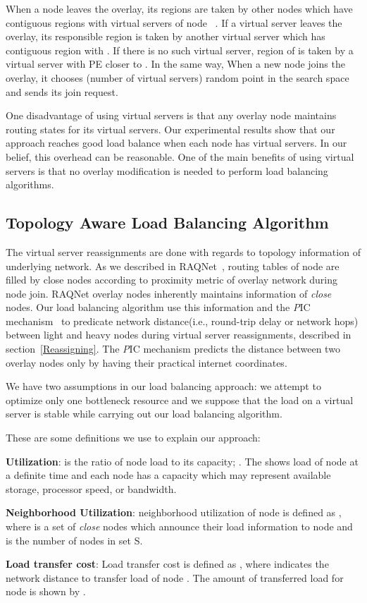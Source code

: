 \documentclass {article}
\begin{document}
When a node  leaves the overlay, its  regions  are taken by other nodes which have contiguous regions with virtual servers of node ~\cite{RAQNet}. If a virtual server  leaves the overlay, its responsible region is taken by another virtual server  which has contiguous region with . If there is no such virtual server, region of  is taken by a virtual server with  PE closer to .
 In the same way, When a new node   joins the overlay, it chooses  (number of virtual servers) random point  in the search space and sends
its join request.


One disadvantage of using virtual servers is that
any overlay node maintains  routing states for its virtual servers.
Our experimental results show that our approach reaches good load  balance when each node has  virtual servers.
In our belief, this overhead can be reasonable. One of the main benefits of using virtual servers is that no overlay modification is needed to perform load balancing algorithms.
\subsection { Topology Aware Load Balancing Algorithm}
The virtual server reassignments are done with regards to topology information of underlying network.
As we described in RAQNet~\cite{RAQNet},
routing tables of  node are filled by close nodes according to proximity metric of overlay network during node join.
 RAQNet overlay nodes inherently maintains information of \emph{close} nodes. Our load balancing algorithm use this information and the {\emph PIC}  mechanism~\cite{PIC} to predicate network distance(i.e., round-trip delay or network hops) between  light  and heavy nodes during virtual server reassignments, described in section~\ref{Reassigning}. The {\emph PIC} mechanism  predicts the distance between two overlay nodes only by having their practical internet coordinates.

We have two assumptions in our load balancing approach:
we attempt to optimize  only one bottleneck resource and we suppose that the load on a virtual server is stable  while carrying out our load balancing algorithm.

These are some definitions we use to explain our approach:
\begin{description}\label{description}
    \item []  {\bf Utilization}:    is the ratio of node  load to its capacity; . The  shows load of node  at a definite time and each node  has a  capacity  which may represent available storage, processor speed, or bandwidth.
	\item [] {\bf Neighborhood Utilization}:  neighborhood utilization of node  is defined as , where  is a set of \emph{close} nodes
which announce their load information to node  and   is the number of nodes in set S.
	\item[] {\bf Load transfer cost}: Load transfer cost  is defined as ,
where
 indicates the network distance to transfer load of node . The amount of transferred load for node  is shown by .
  \end{description}
\end{document}
